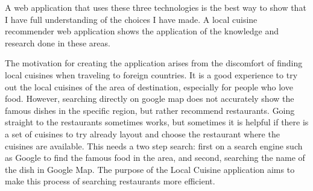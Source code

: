 A web application that uses these three technologies is the best way to show that I have full understanding of the choices I have made. A local cuisine recommender web application shows the application of the knowledge and research done in these areas.

The motivation for creating the application arises from the discomfort of finding local cuisines when traveling to foreign countries. It is a good experience to try out the local cuisines of the area of destination, especially for people who love food. However, searching directly on google map does not accurately show the famous dishes in the specific region, but rather recommend restaurants. Going straight to the restaurants sometimes works, but sometimes it is helpful if there is a set of cuisines to try already layout and choose the restaurant where the cuisines are available. This needs a two step search: first on a search engine such as Google to find the famous food in the area, and second, searching the name of the dish in Google Map. The purpose of the Local Cuisine application aims to make this process of searching restaurants more efficient.






